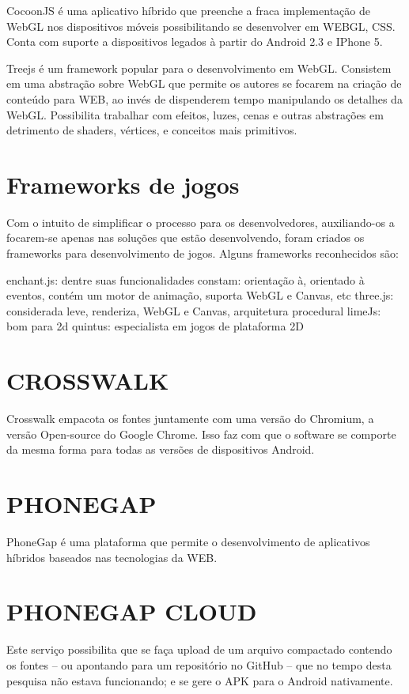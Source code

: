 CocoonJS é uma aplicativo híbrido que preenche a fraca implementação
de WebGL nos dispositivos móveis possibilitando se desenvolver em
WEBGL, CSS. Conta com suporte a dispositivos legados à partir do
Android 2.3 e IPhone 5.

Treejs é um framework popular para o desenvolvimento em WebGL.
Consistem em uma abstração sobre WebGL que permite os autores se
focarem na criação de conteúdo para WEB, ao invés de dispenderem
tempo manipulando os detalhes da WebGL. Possibilita trabalhar com
efeitos, luzes, cenas e outras abstrações em detrimento de shaders,
vértices, e conceitos mais primitivos.

\section{Frameworks de jogos}

Com o intuito de simplificar o processo para os desenvolvedores,
auxiliando-os a focarem-se apenas nas soluções que estão
desenvolvendo, foram criados os frameworks para desenvolvimento de
jogos. Alguns frameworks reconhecidos são:

enchant.js: dentre suas funcionalidades constam: orientação à, orientado à eventos, contém um motor de animação,
suporta WebGL e Canvas, etc three.js: considerada leve, renderiza, WebGL e Canvas, arquitetura procedural
limeJs: bom para 2d
quintus: especialista em jogos de plataforma 2D

\section{CROSSWALK}

Crosswalk empacota os fontes juntamente com uma versão do Chromium, a
versão Open-source do Google Chrome. Isso faz com que o software se
comporte da mesma forma para todas as versões de dispositivos Android.

\section{PHONEGAP}

PhoneGap é uma plataforma que permite o desenvolvimento de aplicativos híbridos baseados nas tecnologias da WEB.

\section{PHONEGAP CLOUD}

Este serviço possibilita que se faça upload de um arquivo compactado
contendo os fontes – ou apontando para um repositório no GitHub –
que no tempo desta pesquisa não estava funcionando; e se gere o APK
para o Android nativamente.

